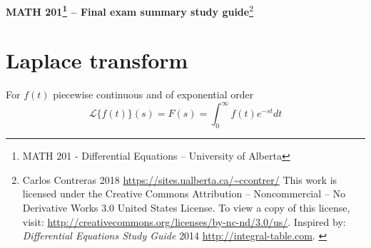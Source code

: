\documentclass[10pt,leqno]{article}
\begin{document}
\pagestyle{empty}

\begin{center}
\begin{LARGE}\textbf{MATH 201\footnote{MATH 201 - Differential Equations -- University of Alberta} -- Final exam summary study guide}\footnote{Carlos Contreras {\scriptsize \textcopyleft \hspace{.5ex} 2018 \url{https://sites.ualberta.ca/~ccontrer/} This work is licensed under the Creative Commons Attribution --  Noncommercial -- No Derivative Works 3.0 United States License. To view a copy of this license, visit:  \url{http://creativecommons.org/licenses/by-nc-nd/3.0/us/}}. Inspired by: \textit{Differential Equations Study Guide} {\scriptsize \textcopyleft \hspace{.5ex} 2014 \hspace{.5ex} \url{http://integral-table.com}. }
 }\end{LARGE}

\section*{Laplace transform}

\begin{minipage}{4in}
For $f(t)$ piecewise continuous and of exponential order 
\begin{equation}
\mathcal{L}\{f(t)\}(s)=F(s)=\int_{0}^{\infty}f(t)e^{-st} dt 
\end{equation}
\end{minipage}

\end{center}
\end{document}

